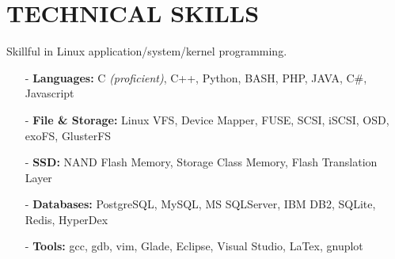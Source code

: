 \section{TECHNICAL SKILLS}
\vspace{0.03in}
Skillful in Linux application/system/kernel programming.
\begin{itemize}[leftmargin=*]
\setlength\itemsep{-0.02in}
\item[-] {\bf Languages:} C {\footnotesize \it (proficient)}, C++,
	Python, BASH, PHP, JAVA, C\#, Javascript
\item[-] {\bf File \& Storage:} Linux VFS, Device Mapper, FUSE, SCSI, iSCSI, OSD,
exoFS, GlusterFS
\item[-] {\bf SSD:} NAND Flash Memory, Storage Class Memory,
	Flash Translation Layer %
\item[-] {\bf Databases:} PostgreSQL, MySQL, MS SQLServer, IBM DB2, SQLite, Redis, HyperDex
\item[-] {\bf Tools:} gcc, gdb, vim, Glade, Eclipse, Visual Studio, LaTex, gnuplot
\end{itemize}

